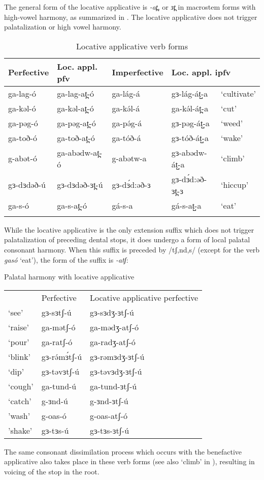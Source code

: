 The general form of the locative applicative is \textit{-at̪}, or \textit{ɜt̪} in macrostem forms with high-vowel harmony, as summarized in . The locative applicative does not trigger palatalization or high vowel harmony.

\begin{table}
\begin{tabular}[t]{lllll}
\lsptoprule
Perfective	& 	Loc. appl. pfv 	& Imperfective & \multicolumn{2}{l}{Loc. appl. ipfv} 	 \\
\midrule
ga-lag-ó	&	ga-lag-at̪-ó		& 	ga-lág-á	&	gɜ-lág-át̺-a 	& ‘cultivate’\\ 
ga-kəl-ó 	&	ga-kəl-at̪-ó 		& ga-kə́l-á 	&	ga-kə́l-át̪-a 	 & ‘cut’ 			\\ %
ga-pəg-ó	&	ga-pəg-at̪-ó		& 	ga-pə́g-á	&	gɜ-pəg-át̺-a 	& ‘weed’\\ 
ga-toð-ó	&	ga-toð-at̪-ó		& 	ga-tóð-á	&	gɜ-tóð-át̺-a 	& ‘wake’\\ 
g-abət-ó	&	ga-abədw-at̪-ó		& 	g-abətw-a	&	gɜ-abədw-át̺-a 	& ‘climb’\\ 
gɜ-dɜdəð-ú	&	gɜ-dɜdəð-ɜt̪-ú	& 	gɜ-dɜ́d:əð-ɜ	&	gɜ-dɜ́d:əð-ɜt̪-ɜ 	& ‘hiccup’\\ 
ga-s-ó	&	ga-s-at̪-ó		& 	gá-s-a	&	gá-s-at̺-a 	& ‘eat’\\ 
\lspbottomrule
\end{tabular}
\caption{Locative applicative verb forms} \label{tab:ch11:loc}    
\end{table}  


While the locative applicative is the only extension suffix which does not trigger palatalization of preceding dental stops, it does undergo a form of local palatal consonant harmony. When this suffix is preceded by /tʃ,nd,s/ (except for the verb \textit{gasó} `eat'), the form of the suffix is \textit{-atʃ}:

\ea Palatal harmony with locative applicative
\begin{tabular}[t]{lll}
& Perfective & {Locative applicative perfective} \\
`see'  	&  gɜ-sɜtʃ-ú 	& gɜ-sɜdʒ-ɜtʃ-ú \\ 
`raise' &  ga-mətʃ-ó 	& ga-mədʒ-atʃ-ó \\ 
`pour' 	& ga-ratʃ-ó  	& ga-radʒ-atʃ-ó \\
`blink' & gɜ-rə́mɜ́tʃ-ú		& gɜ-rəmɜdʒ-ɜtʃ-ú\\
`dip' & gɜ-təvɜtʃ-ú		& gɜ-təvɜdʒ-ɜtʃ-ú\\
`cough' & ga-tund-ú  	& ga-tund-ɜtʃ-ú \\
`catch' & g-ɜnd-ú  		& g-ɜnd-ɜtʃ-ú \\
'wash' 	& g-oas-ó		& g-oas-atʃ-ó  \\ 
'shake' & gɜ-tɜs-ú		& gɜ-tɜs-ɜtʃ-ú  \\ 
\end{tabular}
\z 
The same consonant dissimilation process which occurs with the benefactive applicative also takes place in these verb forms (see also `climb' in ), resulting in voicing of the stop in the root.

